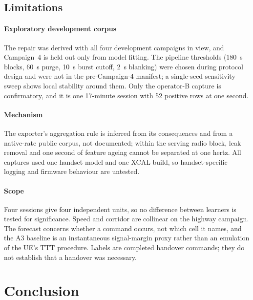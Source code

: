 \documentclass[preprint,review,12pt]{elsarticle}\usepackage{lineno}\linenumbers
\begin{document}
\subsection{Limitations}
\paragraph{Exploratory development corpus} The repair was derived with all four development campaigns in view, and Campaign~4 is held out only from model fitting. The pipeline thresholds (180~s blocks, 60~s purge, 10~s burst cutoff, 2~s blanking) were chosen during protocol design and were not in the pre-Campaign-4 manifest; a single-seed sensitivity sweep shows local stability around them. Only the operator-B capture is confirmatory, and it is one 17-minute session with 52 positive rows at one second.

\paragraph{Mechanism} The exporter's aggregation rule is inferred from its consequences and from a native-rate public corpus, not documented; within the serving radio block, leak removal and one second of feature ageing cannot be separated at one hertz. All captures used one handset model and one XCAL build, so handset-specific logging and firmware behaviour are untested.

\paragraph{Scope} Four sessions give four independent units, so no difference between learners is tested for significance. Speed and corridor are collinear on the highway campaign. The forecast concerns whether a command occurs, not which cell it names, and the A3 baseline is an instantaneous signal-margin proxy rather than an emulation of the UE's TTT procedure. Labels are completed handover commands; they do not establish that a handover was necessary.

\section{Conclusion}
\label{sec:conclusion}
\end{document}
